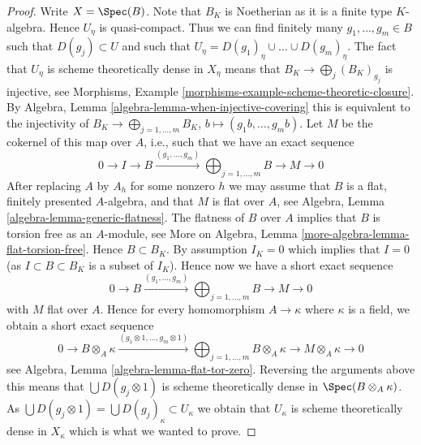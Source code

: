 \begin{proof}
\medskip\noindent
Write $X = \Spec(B)$. Note that $B_K$ is Noetherian as it is a
finite type $K$-algebra. Hence $U_\eta$ is quasi-compact. Thus we can
find finitely many $g_1, \ldots, g_m \in B$ such that $D(g_j) \subset U$
and such that $U_\eta = D(g_1)_\eta \cup \ldots \cup D(g_m)_\eta$.
The fact that $U_\eta$ is scheme theoretically dense in
$X_\eta$ means that $B_K \to \bigoplus_j (B_K)_{g_j}$
is injective, see
Morphisms, Example \ref{morphisms-example-scheme-theoretic-closure}.
By
Algebra, Lemma \ref{algebra-lemma-when-injective-covering}
this is equivalent to the injectivity of
$B_K \to \bigoplus\nolimits_{j = 1, \ldots, m} B_K$,
$b \mapsto (g_1b, \ldots, g_mb)$. Let $M$ be the cokernel of this
map over $A$, i.e., such that we have an exact sequence
$$
0 \to I \to B \xrightarrow{(g_1, \ldots, g_m)}
\bigoplus\nolimits_{j = 1, \ldots, m} B \to M \to 0
$$
After replacing $A$ by $A_h$ for some nonzero $h$ we may assume that $B$
is a flat, finitely presented $A$-algebra, and that $M$
is flat over $A$, see
Algebra, Lemma \ref{algebra-lemma-generic-flatness}.
The flatness of $B$ over $A$ implies that $B$ is torsion free as an
$A$-module, see
More on Algebra, Lemma \ref{more-algebra-lemma-flat-torsion-free}.
Hence $B \subset B_K$. By assumption $I_K = 0$ which implies that $I = 0$
(as $I \subset B \subset B_K$ is a subset of $I_K$). Hence now
we have a short exact sequence
$$
0 \to B \xrightarrow{(g_1, \ldots, g_m)}
\bigoplus\nolimits_{j = 1, \ldots, m} B \to M \to 0
$$
with $M$ flat over $A$. Hence for every homomorphism $A \to \kappa$ where
$\kappa$ is a field, we obtain a short exact sequence
$$
0 \to B \otimes_A \kappa \xrightarrow{(g_1 \otimes 1, \ldots, g_m \otimes 1)}
\bigoplus\nolimits_{j = 1, \ldots, m} B \otimes_A \kappa \to
M \otimes_A \kappa \to 0
$$
see
Algebra, Lemma \ref{algebra-lemma-flat-tor-zero}.
Reversing the arguments above
this means that $\bigcup D(g_j \otimes 1)$ is scheme
theoretically dense in $\Spec(B \otimes_A \kappa)$.
As $\bigcup D(g_j \otimes 1) = \bigcup D(g_j)_\kappa \subset U_\kappa$
we obtain that $U_\kappa$ is scheme theoretically dense in $X_\kappa$
which is what we wanted to prove.
\end{proof}